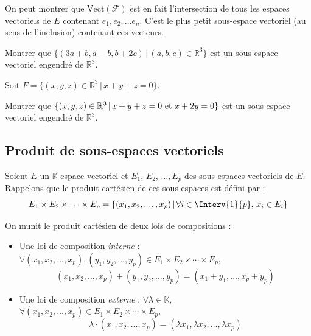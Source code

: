 \documentclass[a4paper,10pt]{report}
\begin{document}
\begin{rem} On peut montrer que $\textrm{Vect}(\mathcal{F})$ est en fait l'intersection de tous les espaces vectoriels de $E$ contenant $e_1, e_2, \ldots e_n$. C'est le plus petit sous-espace vectoriel (au sens de l'inclusion) contenant ces vecteurs.
\end{rem}

\medskip

\begin{exa} Montrer que $\lbrace (3a+b,a-b,b+2c) \, \vert \, (a,b,c) \in \mathbb{R}^3 \rbrace$ est un sous-espace vectoriel engendré de $\mathbb{R}^3$.
\end{exa}

\begin{ex} Soit $F = \lbrace (x,y,z) \in \mathbb{R}^3 \,  \vert \, x+y+z= 0 \rbrace.$ 

\vspace{3cm}

\end{ex}

\begin{exa} Montrer que $\lbrace (x,y,z)  \in \mathbb{R}^3 \, \vert \, x+y+z=0 \hbox{ et } x+2y=0\rbrace$ est un sous-espace vectoriel engendré de $\mathbb{R}^3$.
\end{exa}

\subsection{Produit de sous-espaces vectoriels}

\noindent Soient $E$ un $\mathbb{K}$-espace vectoriel et $E_1$, $E_2$, $\ldots, E_p$ des sous-espaces vectoriels de $E$. Rappelons que le produit cartésien de ces sous-espaces est défini par :
$$ E_1 \times E_2 \times \cdots \times E_p = \left\lbrace (x_1, x_2, \ldots, x_p) \, \vert \, \forall i \in \Interv{1}{p}, \, x_i \in E_i \right\rbrace$$

\noindent On munit le produit cartésien de deux lois de compositions :

\begin{itemize}
\item Une loi de composition \textit{interne} : $\forall (x_1, x_2, \ldots, x_p), (y_1, y_2, \ldots, y_p) \in E_1 \times E_2 \times \cdots \times E_p$,
$$ (x_1, x_2, \ldots, x_p) + (y_1, y_2, \ldots, y_p) = (x_1+y_1, \ldots, x_p + y_p)$$
\item Une loi de composition \textit{externe} : $\forall \lambda \in \mathbb{K}$, $\forall (x_1, x_2, \ldots, x_p) \in E_1 \times E_2 \times \cdots \times E_p$,
$$ \lambda \cdot (x_1, x_2, \ldots, x_p) = (\lambda x_1, \lambda x_2, \ldots, \lambda x_p)$$
\end{itemize}
\end{document}

